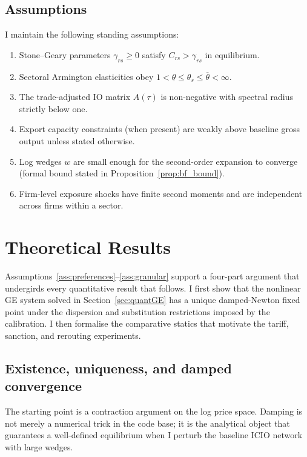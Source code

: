 \documentclass[12pt]{article}
\begin{document}
\subsection{Assumptions}
I maintain the following standing assumptions:
\begin{enumerate}[label=A\arabic*]
    \item \label{ass:preferences} Stone--Geary parameters $\gamma_{rs}\geq 0$ satisfy $C_{rs}>\gamma_{rs}$ in equilibrium.
    \item \label{ass:armington} Sectoral Armington elasticities obey $1<\underline{\theta}\leq \theta_s\leq \overline{\theta}<\infty$.
    \item \label{ass:technology} The trade-adjusted IO matrix $A(\tau)$ is non-negative with spectral radius strictly below one.
    \item \label{ass:capacity} Export capacity constraints (when present) are weakly above baseline gross output unless stated otherwise.
    \item \label{ass:shocks} Log wedges $w$ are small enough for the second-order expansion to converge (formal bound stated in Proposition~\ref{prop:bf_bound}).
    \item \label{ass:granular} Firm-level exposure shocks have finite second moments and are independent across firms within a sector.
\end{enumerate}

\section{Theoretical Results}
Assumptions~\ref{ass:preferences}--\ref{ass:granular} support a four-part argument that undergirds every quantitative result that follows. I first show that the nonlinear GE system solved in Section~\ref{sec:quantGE} has a unique damped-Newton fixed point under the dispersion and substitution restrictions imposed by the calibration. I then formalise the comparative statics that motivate the tariff, sanction, and rerouting experiments.

\subsection{Existence, uniqueness, and damped convergence}
The starting point is a contraction argument on the log price space. Damping is not merely a numerical trick in the code base; it is the analytical object that guarantees a well-defined equilibrium when I perturb the baseline ICIO network with large wedges.
\end{document}
